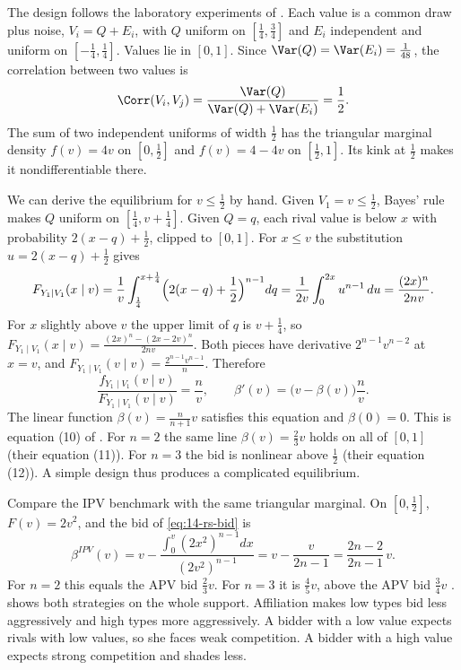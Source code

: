  The design follows the laboratory experiments of
\citet{KagelHarstadLevin1987}. Each value is a common draw plus noise, $V_i=Q+E_i$, with $Q$ uniform on
$[\frac14,\frac34]$ and $E_i$ independent and uniform on $[-\frac14,\frac14]$. Values lie in $[0,1]$. Since
$\Var(Q)=\Var(E_i)=\frac{1}{48}$, the correlation between two values is
\begin{equation*}
  \Corr(V_i,V_j)=\frac{\Var(Q)}{\Var(Q)+\Var(E_i)}=\frac12 .
\end{equation*}
The sum of two independent uniforms of width $\frac12$ has the triangular marginal density
$f(v)=4v$ on $[0,\frac12]$ and $f(v)=4-4v$ on $[\frac12,1]$. Its kink at $\frac12$ makes it
nondifferentiable there.

We can derive the equilibrium for $v\le\frac12$ by hand. Given $V_1=v\le\frac12$, Bayes' rule makes $Q$
uniform on $[\frac14,v+\frac14]$. Given $Q=q$, each rival value is below $x$ with probability
$2(x-q)+\frac12$, clipped to $[0,1]$. For $x\le v$ the substitution $u=2(x-q)+\frac12$ gives
\begin{equation*}
  F_{Y_1\mid V_1}(x\mid v)=\frac1v\int_{\frac14}^{x+\frac14}\Bigl(2(x-q)+\frac12\Bigr)^{n-1}dq
  =\frac{1}{2v}\int_0^{2x}u^{n-1}\,du=\frac{(2x)^n}{2nv}.
\end{equation*}
For $x$ slightly above $v$ the upper limit of $q$ is $v+\frac14$, so
$F_{Y_1\mid V_1}(x\mid v)=\frac{(2x)^n-(2x-2v)^n}{2nv}$. Both pieces have derivative $2^{n-1}v^{n-2}$ at
$x=v$, and $F_{Y_1\mid V_1}(v\mid v)=\frac{2^{n-1}v^{n-1}}{n}$. Therefore
\begin{equation*}
  \frac{f_{Y_1\mid V_1}(v\mid v)}{F_{Y_1\mid V_1}(v\mid v)}=\frac nv,
  \qquad
  \beta'(v)=\bigl(v-\beta(v)\bigr)\frac nv .
\end{equation*}
The linear function $\beta(v)=\frac{n}{n+1}v$ satisfies this equation and $\beta(0)=0$. This is equation (10)
of \citet{LiPerrigneVuong2002}. For $n=2$ the same line $\beta(v)=\frac23v$ holds on all of $[0,1]$
(their equation (11)). For $n=3$ the bid is nonlinear above $\frac12$ (their equation (12)). A simple
design thus produces a complicated equilibrium.

Compare the IPV benchmark with the same triangular marginal. On $[0,\frac12]$, $F(v)=2v^2$, and the
bid of \eqref{eq:14-rs-bid} is
\begin{equation*}
  \beta^{IPV}(v)=v-\frac{\int_0^v(2x^2)^{n-1}dx}{(2v^2)^{n-1}}=v-\frac{v}{2n-1}=\frac{2n-2}{2n-1}\,v .
\end{equation*}
For $n=2$ this equals the APV bid $\frac23v$. For $n=3$ it is $\frac45v$, above the APV bid $\frac34v$
\citep[footnote~17]{LiPerrigneVuong2002}.  shows both strategies on the whole
support. Affiliation makes low types bid less aggressively and high types more aggressively. A bidder with a
low value expects rivals with low values, so she faces weak competition. A bidder with a high value expects
strong competition and shades less.

